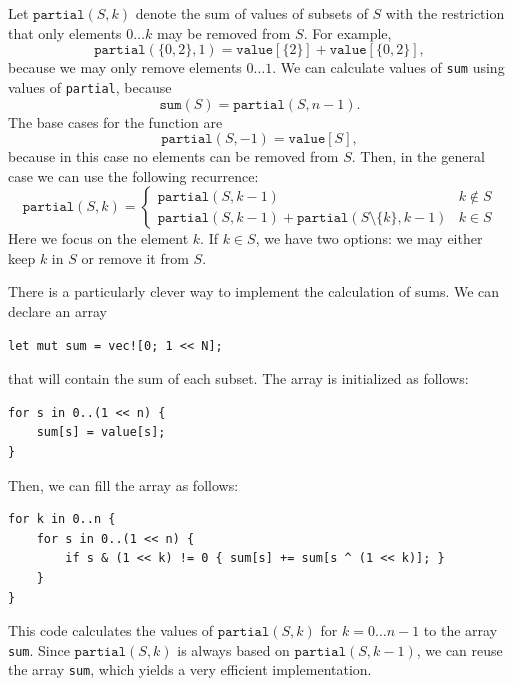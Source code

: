 Let $\texttt{partial}(S,k)$ denote the sum of
values of subsets of $S$ with the restriction
that only elements $0 \ldots k$
may be removed from $S$.
For example,
\[\texttt{partial}(\{0,2\},1)=\texttt{value}[\{2\}]+\texttt{value}[\{0,2\}],\]
because we may only remove elements $0 \ldots 1$.
We can calculate values of \texttt{sum} using
values of \texttt{partial}, because
\[\texttt{sum}(S) = \texttt{partial}(S,n-1).\]
The base cases for the function are
\[\texttt{partial}(S,-1)=\texttt{value}[S],\]
because in this case no elements can be removed from $S$.
Then, in the general case we can use the following recurrence:
\begin{equation*}
    \texttt{partial}(S,k) = \begin{cases}
               \texttt{partial}(S,k-1) & k \notin S \\
               \texttt{partial}(S,k-1) + \texttt{partial}(S \setminus \{k\},k-1) & k \in S
           \end{cases}
\end{equation*}
Here we focus on the element $k$.
If $k \in S$, we have two options: we may either keep $k$ in $S$
or remove it from $S$.

There is a particularly clever way to implement the
calculation of sums. We can declare an array
\begin{lstlisting}
let mut sum = vec![0; 1 << N];
\end{lstlisting}
that will contain the sum of each subset.
The array is initialized as follows:
\begin{lstlisting}
for s in 0..(1 << n) {
    sum[s] = value[s];
}
\end{lstlisting}
Then, we can fill the array as follows:
\begin{lstlisting}
for k in 0..n {
    for s in 0..(1 << n) {
        if s & (1 << k) != 0 { sum[s] += sum[s ^ (1 << k)]; }
    }
}
\end{lstlisting}
This code calculates the values of $\texttt{partial}(S,k)$
for $k=0 \ldots n-1$ to the array \texttt{sum}.
Since $\texttt{partial}(S,k)$ is always based on
$\texttt{partial}(S,k-1)$, we can reuse the array
\texttt{sum}, which yields a very efficient implementation.